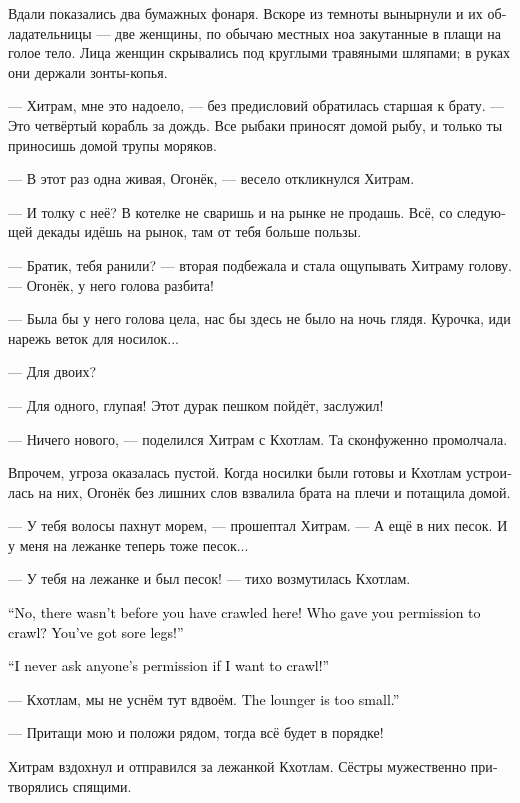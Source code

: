 \documentclass[a4paper,12pt,fleqn]{book}\usepackage{cooltooltips}\usepackage{polyglossia}\setdefaultlanguage{russian}\setotherlanguage{english}\defaultfontfeatures{Ligatures=TeX,Mapping=tex-text} \usepackage{xcolor}\definecolor{lightgray}{HTML}{bbbbbb}\color{lightgray}\newcommand{\ml}[3]{\textenglish{\textcolor{black}{#3}}}
\newcommand{\asterism}{\vspace{1em}{\centering\Large\bfseries$\ast~\ast~\ast$\par}\vspace{1em}}
\begin{document}
Вдали показались два бумажных фонаря.
Вскоре из темноты вынырнули и их обладательницы --- две женщины, по обычаю местных ноа закутанные в плащи на голое тело.
Лица женщин скрывались под круглыми травяными шляпами;
в руках они держали зонты-копья.

--- Хитрам, мне это надоело, --- без предисловий обратилась старшая к брату.
--- Это четвёртый корабль за дождь.
Все рыбаки приносят домой рыбу, и только ты приносишь домой трупы моряков.

--- В этот раз одна живая, Огонёк, --- весело откликнулся Хитрам.

--- И толку с неё?
В котелке не сваришь и на рынке не продашь.
Всё, со следующей декады идёшь на рынок, там от тебя больше пользы.

--- Братик, тебя ранили? --- вторая подбежала и стала ощупывать Хитраму голову.
--- Огонёк, у него голова разбита!

--- Была бы у него голова цела, нас бы здесь не было на ночь глядя.
Курочка, иди нарежь веток для носилок...

--- Для двоих?

--- Для одного, глупая!
Этот дурак пешком пойдёт, заслужил!

--- Ничего нового, --- поделился Хитрам с Кхотлам.
Та сконфуженно промолчала.

Впрочем, угроза оказалась пустой.
Когда носилки были готовы и Кхотлам устроилась на них, Огонёк без лишних слов взвалила брата на плечи и потащила домой.

\asterism

--- У тебя волосы пахнут морем, --- прошептал Хитрам.
--- А ещё в них песок.
И у меня на лежанке теперь тоже песок...

--- У тебя на лежанке и был песок! --- тихо возмутилась Кхотлам.

\ml{$0$}
{--- Нет, не было, пока ты не приползла!}
{``No, there wasn't before you have crawled here!}
\ml{$0$}
{Кто вообще разрешил тебе ползать?}
{Who gave you permission to crawl?}
\ml{$0$}
{У тебя ножки больные!}
{You've got sore legs!''}

\ml{$0$}
{--- Я не спрашиваю чужого разрешения, если хочу поползать!}
{``I never ask anyone's permission if I want to crawl!''}

--- Кхотлам, мы не уснём тут вдвоём.
\ml{$0$}
{Лежанка чересчур маленькая.}
{The lounger is too small.''}

--- Притащи мою и положи рядом, тогда всё будет в порядке!

Хитрам вздохнул и отправился за лежанкой Кхотлам.
Сёстры мужественно притворялись спящими.
\end{document}
